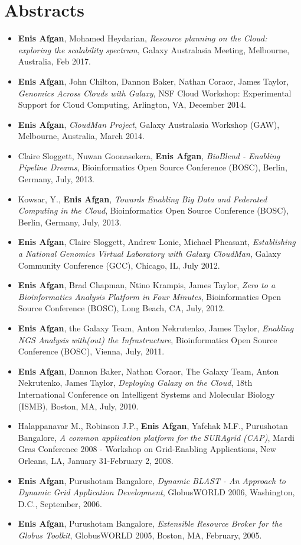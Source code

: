\documentclass{article}
\begin{document}
\section{Abstracts}
\begin {itemize}
    \item \textbf{Enis Afgan}, Mohamed Heydarian, \textit{Resource planning on the Cloud: exploring the scalability spectrum}, Galaxy Australasia Meeting, Melbourne, Australia, Feb 2017.
    \item \textbf{Enis Afgan}, John Chilton, Dannon Baker, Nathan Coraor, James Taylor,  \textit{Genomics Across Clouds with Galaxy}, NSF Cloud Workshop: Experimental Support for Cloud Computing, Arlington, VA, December 2014.
    \item \textbf{Enis Afgan}, \textit{CloudMan Project}, Galaxy Australasia Workshop (GAW), Melbourne, Australia, March 2014.
    \item Claire Sloggett, Nuwan Goonasekera,  \textbf{Enis Afgan}, \textit{BioBlend - Enabling Pipeline Dreams}, Bioinformatics Open Source Conference (BOSC), Berlin, Germany, July, 2013.
    \item Kowsar, Y.,  \textbf{Enis Afgan}, \textit{Towards Enabling Big Data and Federated Computing in the Cloud}, Bioinformatics Open Source Conference (BOSC), Berlin, Germany, July, 2013.
    \item \textbf{Enis Afgan}, Claire Sloggett, Andrew Lonie, Michael Pheasant,  \textit{Establishing a National Genomics Virtual Laboratory with Galaxy CloudMan}, Galaxy Community Conference (GCC), Chicago, IL, July 2012.
    \item \textbf{Enis Afgan}, Brad Chapman, Ntino Krampis, James Taylor, \textit{Zero to a Bioinformatics Analysis Platform in Four Minutes}, Bioinformatics Open Source Conference (BOSC), Long Beach, CA, July, 2012.
    \item \textbf{Enis Afgan}, the Galaxy Team, Anton Nekrutenko, James Taylor, \textit{Enabling NGS Analysis with(out) the Infrastructure}, Bioinformatics Open Source Conference (BOSC), Vienna, July, 2011.
    \item \textbf{Enis Afgan}, Dannon Baker, Nathan Coraor, The Galaxy Team, Anton Nekrutenko, James Taylor,  \textit{Deploying Galaxy on the Cloud}, 18th International Conference on Intelligent Systems and Molecular Biology (ISMB), Boston, MA, July, 2010.
    \item Halappanavar M., Robinson J.P.,  \textbf{Enis Afgan}, Yafchak M.F., Purushotan Bangalore, \textit{A common application platform for the SURAgrid (CAP)}, Mardi Gras Conference 2008 - Workshop on Grid-Enabling Applications, New Orleans, LA, January 31-February 2, 2008.
    \item \textbf{Enis Afgan}, Purushotam Bangalore, \textit{Dynamic BLAST - An Approach to Dynamic Grid Application Development}, GlobusWORLD 2006, Washington, D.C., September, 2006.
    \item \textbf{Enis Afgan}, Purushotam Bangalore,  \textit{Extensible Resource Broker for the Globus Toolkit}, GlobusWORLD 2005, Boston, MA, February, 2005. 
    
\end{itemize}
    
\end{document}
